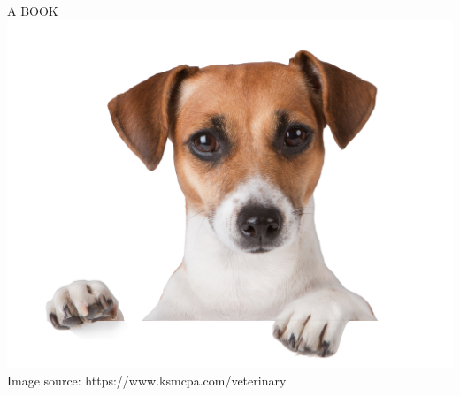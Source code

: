 \thispagestyle{empty}
\begin{center}
{\Huge A BOOK}
\includegraphics{cover.png}
{\huge Image source: https://www.ksmcpa.com/veterinary}
\end{center}

\let\maketitle\oldmaketitle
\maketitle
